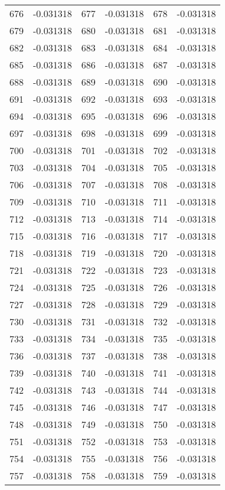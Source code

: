 \documentclass[12pt]{article}
\begin{document}
\begin{longtable}{@{}cc|cc|cc@{}}
676 & -0.031318 & 677 & -0.031318 & 678 & -0.031318 \\
679 & -0.031318 & 680 & -0.031318 & 681 & -0.031318 \\
682 & -0.031318 & 683 & -0.031318 & 684 & -0.031318 \\
685 & -0.031318 & 686 & -0.031318 & 687 & -0.031318 \\
688 & -0.031318 & 689 & -0.031318 & 690 & -0.031318 \\
691 & -0.031318 & 692 & -0.031318 & 693 & -0.031318 \\
694 & -0.031318 & 695 & -0.031318 & 696 & -0.031318 \\
697 & -0.031318 & 698 & -0.031318 & 699 & -0.031318 \\
700 & -0.031318 & 701 & -0.031318 & 702 & -0.031318 \\
703 & -0.031318 & 704 & -0.031318 & 705 & -0.031318 \\
706 & -0.031318 & 707 & -0.031318 & 708 & -0.031318 \\
709 & -0.031318 & 710 & -0.031318 & 711 & -0.031318 \\
712 & -0.031318 & 713 & -0.031318 & 714 & -0.031318 \\
715 & -0.031318 & 716 & -0.031318 & 717 & -0.031318 \\
718 & -0.031318 & 719 & -0.031318 & 720 & -0.031318 \\
721 & -0.031318 & 722 & -0.031318 & 723 & -0.031318 \\
724 & -0.031318 & 725 & -0.031318 & 726 & -0.031318 \\
727 & -0.031318 & 728 & -0.031318 & 729 & -0.031318 \\
730 & -0.031318 & 731 & -0.031318 & 732 & -0.031318 \\
733 & -0.031318 & 734 & -0.031318 & 735 & -0.031318 \\
736 & -0.031318 & 737 & -0.031318 & 738 & -0.031318 \\
739 & -0.031318 & 740 & -0.031318 & 741 & -0.031318 \\
742 & -0.031318 & 743 & -0.031318 & 744 & -0.031318 \\
745 & -0.031318 & 746 & -0.031318 & 747 & -0.031318 \\
748 & -0.031318 & 749 & -0.031318 & 750 & -0.031318 \\
751 & -0.031318 & 752 & -0.031318 & 753 & -0.031318 \\
754 & -0.031318 & 755 & -0.031318 & 756 & -0.031318 \\
757 & -0.031318 & 758 & -0.031318 & 759 & -0.031318 \\

\end{longtable}
\end{document}
